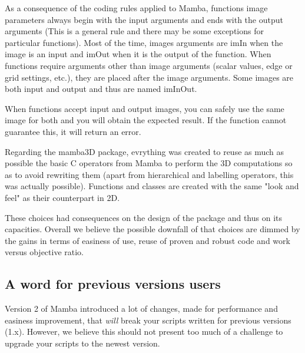 \documentclass[a4paper,10pt,oneside]{article}
\begin{document}
As a consequence of the coding rules applied to Mamba, functions image parameters
always begin with the input arguments and ends with the output arguments (This 
is a general rule and there may be some exceptions for particular functions).
Most of the time, images arguments are imIn when the image is an input and imOut
when it is the output of the function. When functions require arguments other than 
image arguments (scalar values, edge or grid settings, etc.), they are placed after 
the image arguments. Some images are both input and output and thus are named
imInOut.

When functions accept input and output images, you can safely use the same image
for both and you will obtain the expected result. If the function cannot 
guarantee this, it will return an error.

Regarding the mamba3D package, evrything was created to reuse as much as
possible the basic C operators from Mamba to perform the 3D computations so
as to avoid rewriting them (apart from hierarchical and labelling operators,
this was actually possible). Functions and classes are created with the same
"look and feel" as their counterpart in 2D.

These choices had consequences on the design of the package and thus on its
capacities. Overall we believe the possible downfall of that choices are
dimmed by the gains in terms of easiness of use, reuse of proven and robust
code and work versus objective ratio.

\subsection{A word for previous versions users}
\label{cha:change_mamba2}

Version 2 of Mamba introduced a lot of changes, made for performance and
easiness improvement, that \emph{will} break your scripts written for previous
versions (1.x). However, we believe this should not present too much of a
challenge to upgrade your scripts to the newest version.
\end{document}
